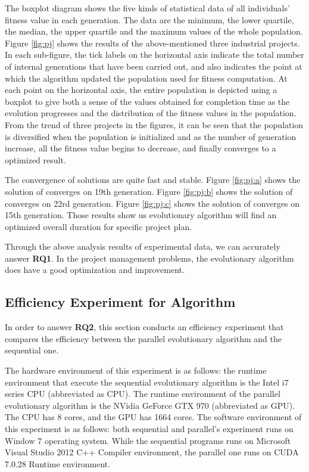 The boxplot diagram shows the five kinds of statistical data of all individuals'
fitness value in each generation. The data are the minimum, the lower quartile,
the median, the upper quartile and the maximum values of the whole
population. Figure \ref{fig:pj} shows the results of the above-mentioned three
industrial projects. In each sub-figure, the tick labels on the horizontal axis
indicate the total number of internal generations that have been carried out,
and also indicates the point at which the algorithm updated the population used
for fitness computation. At each point on the horizontal axis, the entire
population is depicted using a boxplot to give both a sense of the values
obtained for completion time as the evolution progresses and the distribution of
the fitness values in the population. From the trend of three projects in the
figures, it can be seen that the population is diversified when the population
is initialized and as the number of generation increase, all the fitness value
begins to decrease, and finally converges to a optimized result.

The convergence of solutions are quite fast and stable. Figure \ref{fig:pj:a}
shows the solution of \projectA{} converges on 19th generation. Figure
\ref{fig:pj:b} shows the solution of \projectB{} converges on 22rd generation.
Figure \ref{fig:pj:c} shows the solution of \projectC{} converges on 15th
generation. Those results show us evolutionary algorithm will find an optimized
overall duration for specific project plan.

Through the above analysis results of experimental data, we can accurately
answer \textbf{RQ1}. In the project management problems, the evolutionary
algorithm does have a good optimization and improvement.


\subsection{Efficiency Experiment for Algorithm}
%
In order to answer \textbf{RQ2}, this section conducts an efficiency experiment
that compares the efficiency between the parallel evolutionary algorithm and the
sequential one.

The hardware environment of this experiment is as follows: the runtime
environment that execute the sequential evolutionary algorithm is the Intel i7
series CPU (abbreviated as CPU). The runtime environment of the parallel
evolutionary algorithm is the NVidia GeForce GTX 970 (abbreviated as GPU). The
CPU has 8 cores, and the GPU has 1664 cores. The software environment of this
experiment is as follows: both sequential and parallel's experiment runs on
Window 7 operating system. While the sequential programs runs on Microsoft
Visual Studio 2012 C++ Compiler environment, the parallel one runs on CUDA
7.0.28 Runtime environment.

